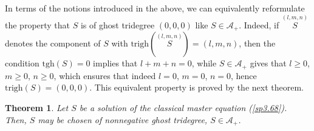 \documentclass[a4paper,12pt]{article}
\newtheorem{theorem}{Theorem}
\begin{document}
In terms of the notions introduced in the above, we can equivalently
reformulate the property that $S$ is of ghost tridegree $\left( 0,0,0\right) 
$ like $S\in \mathcal{A}_{+}$. Indeed, if $\stackrel{(l,m,n)}{S}$ denotes
the component of $S$ with $\mathrm{trigh}\left( \stackrel{(l,m,n)}{S}\right)
=\left( l,m,n\right) $, then the condition $\mathrm{tgh}\left( S\right) =0$
implies that $l+m+n=0$, while $S\in \mathcal{A}_{+}$ gives that $l\geq 0$, $%
m\geq 0$, $n\geq 0$, which ensures that indeed $l=0$, $m=0$, $n=0$, hence $%
\mathrm{trigh}\left( S\right) =\left( 0,0,0\right) $. This equivalent
property is proved by the next theorem.

\begin{theorem}
Let $S$ be a solution of the classical master equation (\ref{sp3.68}). Then, 
$S$ may be chosen of nonnegative ghost tridegree, $S\in \mathcal{A}_{+}$.
\end{theorem}
\end{document}
